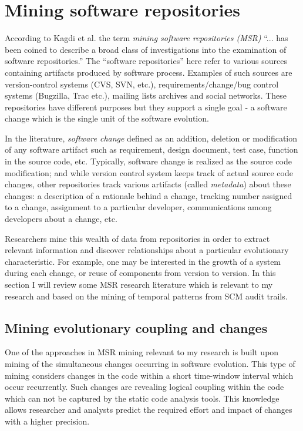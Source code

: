 \section{Mining software repositories}\label{evolution.discovery}
According to Kagdi et al. \cite{citeulike:4534888} the term \textit{mining software repositories (MSR)} ``... has been coined to describe a broad class of investigations into the examination of software repositories.'' The ``software repositories'' here refer to various sources containing artifacts produced by software process. Examples of such sources are version-control systems (CVS, SVN, etc.), requirements/change/bug control systems (Bugzilla, Trac etc.), mailing lists archives and social networks. These repositories have different purposes but they support a single goal - a software change which is the single unit of the software evolution. 

In the literature, \textit{software change} defined as an addition, deletion or modification of any software artifact such as requirement, design document, test case, function in the source code, etc. Typically, software change is realized as the source code modification; and while version control system keeps track of actual source code changes, other repositories track various artifacts (called \textit{metadata}) about these changes: a description of a rationale behind a change, tracking number assigned to a change, assignment to a particular developer, communications among developers about a change, etc.

Researchers mine this wealth of data from repositories in order to extract relevant information and discover relationships about a particular evolutionary characteristic. For example, one may be interested in the growth of a system during each change, or reuse of components from version to version. In this section I will review some MSR research literature which is relevant to my research and based on the mining of temporal patterns from SCM audit trails.

\subsection{Mining evolutionary coupling and changes}
One of the approaches in MSR mining relevant to my research is built upon mining of the simultaneous changes occurring in software evolution. This type of mining considers changes in the code within a short time-window interval which occur recurrently. Such changes are revealing logical coupling within the code which can not be captured by the static code analysis tools. This knowledge allows researcher and analysts predict the required effort and impact of changes with a higher precision. 

